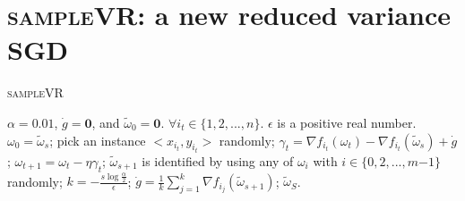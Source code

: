 \documentclass[letterpaper]{article}
\begin{document}
\section{\textsc{sampleVR}: a new reduced variance SGD}
\label{sect_sample_vr}

\begin{algorithm}[t]
    \caption{\textsc{sampleVR}}
    \label{algorithm_sampleVR}
    \begin{algorithmic}[1]
        \Require $\alpha=0.01$,  $\dot{g}=\mathbf{0}$, and $\tilde{\omega}_0=\mathbf{0}$. $\forall i_t\in\{1,2, ..., n\}$.   $\epsilon$ is a positive real number.
            \State $\omega_0=\tilde{\omega}_s$;
                \State pick an instance $\mathrm{<}x_{i_t},y_{i_t}\mathrm{>}$ randomly;
                \State $\gamma_{t}=\nabla f_{i_t}(\omega_t)-\nabla f_{i_t}(\tilde{\omega}_s)+\dot{g}$;
                \State $\omega_{t+1} = \omega_t - \eta \gamma_{t}$;
            \EndFor
            \State $\tilde{\omega}_{s+1}$ is identified by using any of $\omega_{i}$ with $i\mathrm{\in}\{0,2, ..., m\mathrm{-}1\}$ randomly;
            \State $k=-\frac{s\log\frac{\alpha}{2}}{\epsilon}$;
            \State $\dot{g} =\frac{1}{k}\sum\limits_{j=1}^{k}\nabla f_{i_j}(\tilde{\omega}_{s+1})$;
          \EndFor
        \Return $\tilde{\omega}_S$.
    \end{algorithmic}
\end{algorithm}
\end{document}
